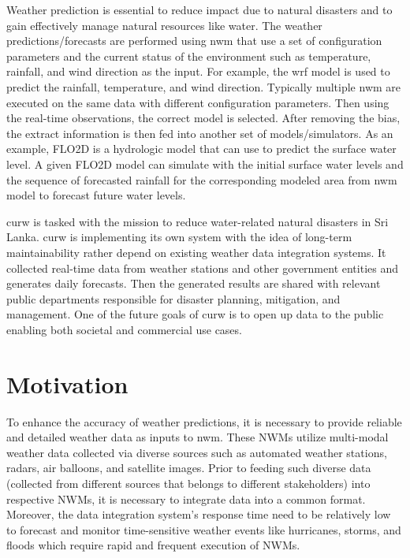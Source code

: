 Weather prediction is essential to reduce impact due to natural disasters and to gain effectively manage natural resources like water. The weather predictions/forecasts are performed using \acrfull{nwm} that use a set of configuration parameters and the current status of the environment such as temperature, rainfall, and wind direction as the input. For example, the \acrfull{wrf} \cite{MesoscaleMicroscaleMeteorologyLaboratoryWeatherModel} model is used to predict the rainfall, temperature, and wind direction. Typically multiple \acrshort{nwm} are executed on the same data with different configuration parameters. Then using the real-time observations, the correct model is selected. After removing the bias, the extract information is then fed into another set of models/simulators. 
As an example, FLO2D is a hydrologic model that can use to predict the surface water level. A given FLO2D model can simulate with the initial surface water levels and the sequence of forecasted rainfall for the corresponding modeled area from \acrshort{nwm} model to forecast future water levels.

\acrfull{curw} \cite{CUrWSL2017SL} is tasked with the mission to reduce water-related natural disasters in Sri Lanka. \acrshort{curw} \cite{CUrWSLObservedSL} is implementing its own system with the idea of long-term maintainability rather depend on existing weather data integration systems. It collected real-time data from weather stations and other government entities and generates daily forecasts. Then the generated results are shared with relevant public departments responsible for disaster planning, mitigation, and management. One of the future goals of \acrshort{curw} is to open up data to the public enabling both societal and commercial use cases.

\section{Motivation}
To enhance the accuracy of weather predictions, it is necessary to provide reliable and detailed weather data as inputs to \acrshort{nwm}. These NWMs utilize multi-modal weather data collected via diverse sources such as automated weather stations, radars, air balloons, and satellite images. Prior to feeding such diverse data (collected from different sources that belongs to different stakeholders) into respective NWMs, it is necessary to integrate data into a common format. Moreover, the data integration system’s response time need to be relatively low to forecast and monitor time-sensitive weather events like hurricanes, storms, and floods which require rapid and frequent execution of NWMs.

